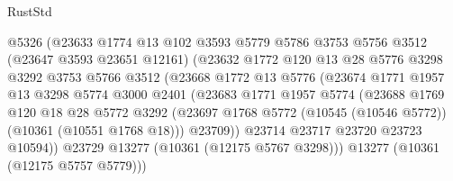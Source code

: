\begin{lexlean}{RustStd}
\begin{coremodule}
                            @5326
                            (@23633
                              @1774
                              @13
                              @102
                              @3593
                              @5779
                              @5786
                              @3753
                              @5756
                              @3512
                              (@23647 @3593 @23651 @12161)
                              (@23632
                                @1772
                                @120
                                @13
                                @28
                                @5776
                                @3298
                                @3292
                                @3753
                                @5766
                                @3512
                                (@23668
                                  @1772
                                  @13
                                  @5776
                                  (@23674
                                    @1771
                                    @1957
                                    @13
                                    @3298
                                    @5774
                                    @3000
                                    @2401
                                    (@23683
                                      @1771
                                      @1957
                                      @5774
                                      (@23688
                                        @1769
                                        @120
                                        @18
                                        @28
                                        @5772
                                        @3292
                                        (@23697
                                          @1768
                                          @5772
                                          (@10545 (@10546 @5772))
                                          (@10361 (@10551 @1768 @18)))
                                        @23709))
                                    @23714
                                    @23717
                                    @23720
                                    @23723
                                    @10594))
                                @23729
                                @13277
                                (@10361 (@12175 @5767 @3298)))
                              @13277
                              (@10361 (@12175 @5757 @5779)))

\end{coremodule}
\end{lexlean}
